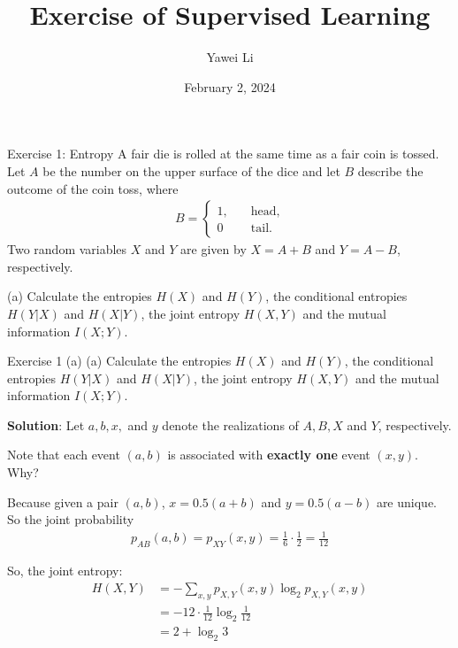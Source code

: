 \documentclass[aspectratio=169]{beamer}
\title[]{\textbf{Exercise of Supervised Learning}}
\author{Yawei Li}
\institute[LMU]
{
\\
  \texttt{yawei.li@stat.uni-muenchen.de}
}
\date{February 2, 2024}
\begin{document}
\begin{frame}
\titlepage

\end{frame}

\begin{frame}{Exercise 1: Entropy}
	A fair die is rolled at the same time as a fair coin is tossed. Let $A$ be the number on the upper surface of the dice and let $B$ describe the outcome of the coin toss, where 
	\begin{align*}
		B = \begin{cases}
			1, \quad & \text{head,} \\
			0 \quad & \text{tail.}
		\end{cases}
	\end{align*}
	Two random variables $X$ and $Y$ are given by $X = A + B$ and $Y = A - B$, respectively.
	\vspace{10pt}
	
	(a) Calculate the entropies $H(X)$ and $H(Y)$, the conditional entropies $H(Y|X)$ and $H(X|Y)$, the joint entropy $H(X, Y)$ and the mutual information $I(X;Y)$.
\end{frame}

\begin{frame}{Exercise 1 (a)}
(a) Calculate the entropies $H(X)$ and $H(Y)$, the conditional entropies $H(Y|X)$ and $H(X|Y)$, the joint entropy $H(X, Y)$ and the mutual information $I(X;Y)$.

\textbf{Solution}: Let $a, b, x,$ and $y$ denote the realizations of $A, B, X$ and $Y$, respectively.

Note that each event $(a,b)$ is associated with \textbf{exactly one} event $(x,y)$. Why?

Because given a pair $(a, b)$, $x = 0.5 (a + b)$ and $y = 0.5 (a - b)$ are unique. 
So the joint probability
\begin{align*}
	p_{AB}(a, b) = p_{XY}(x, y) = \frac{1}{6} \cdot \frac{1}{2} = \frac{1}{12}
\end{align*}

So, the joint entropy:
\begin{align*}
	H(X, Y) &= - \sum_{x, y} p_{X, Y}(x,y) \log_2 p_{X, Y}(x, y) \\ 
	&= - 12 \cdot \frac{1}{12} \log_2 \frac{1}{12} \\ 
	&= 2 + \log_2 3
\end{align*}
	
\end{frame}
\end{document}
